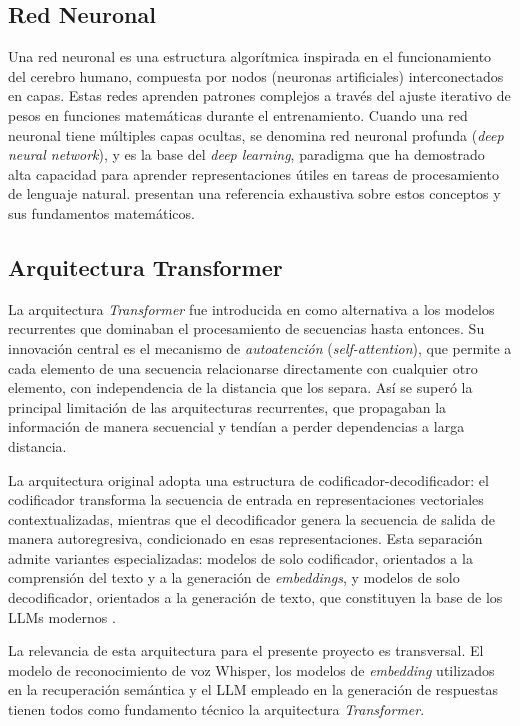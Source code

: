 \subsection{Red Neuronal}
\label{subsection:2-Red Neuronal}

Una red neuronal es una estructura algorítmica inspirada en el funcionamiento del cerebro humano, compuesta por nodos (neuronas artificiales) interconectados en capas. Estas redes aprenden patrones complejos a través del ajuste iterativo de pesos en funciones matemáticas durante el entrenamiento. Cuando una red neuronal tiene múltiples capas ocultas, se denomina red neuronal profunda (\textit{deep neural network}), y es la base del \textit{deep learning}, paradigma que ha demostrado alta capacidad para aprender representaciones útiles en tareas de procesamiento de lenguaje natural.  \cite{Goodfellow-et-al-2016} presentan una referencia exhaustiva sobre estos conceptos y sus fundamentos matemáticos.


\subsection{Arquitectura Transformer}
\label{subsection:2-Arquitectura Transformer}

La arquitectura \textit{Transformer} fue introducida en \cite{vaswani2017attention} como alternativa a los modelos recurrentes que dominaban el procesamiento de secuencias hasta entonces. Su innovación central es el mecanismo de \textit{autoatención} (\textit{self-attention}), que permite a cada elemento de una secuencia relacionarse directamente con cualquier otro elemento, con independencia de la distancia que los separa. Así se superó la principal limitación de las arquitecturas recurrentes, que propagaban la información de manera secuencial y tendían a perder dependencias a larga distancia.

La arquitectura original adopta una estructura de codificador-decodificador: el codificador transforma la secuencia de entrada en representaciones vectoriales contextualizadas, mientras que el decodificador genera la secuencia de salida de manera autoregresiva, condicionado en esas representaciones. Esta separación admite variantes especializadas: modelos de solo codificador, orientados a la comprensión del texto y a la generación de \textit{embeddings}, y modelos de solo decodificador, orientados a la generación de texto, que constituyen la base de los LLMs modernos \cite{SpeechandLanguageProcessing}.

La relevancia de esta arquitectura para el presente proyecto es transversal. El modelo de reconocimiento de voz Whisper, los modelos de \textit{embedding} utilizados en la recuperación semántica y el LLM empleado en la generación de respuestas tienen todos como fundamento técnico la arquitectura \textit{Transformer}.

